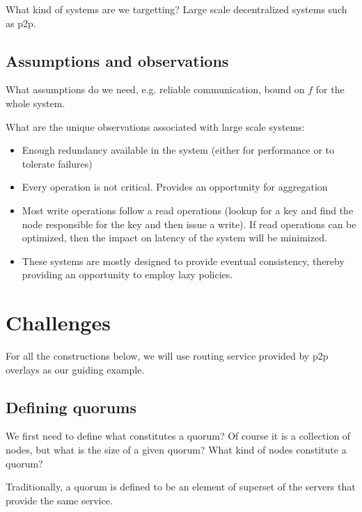 What kind of systems are we targetting? Large scale decentralized systems such as p2p. 
 
\subsection{Assumptions and observations} 
What assumptions do we need, e.g. reliable communication, bound on $f$ for the whole system. 
 
What are the unique observations associated with large scale systems: 
\begin{itemize} 
\item{} Enough redundancy available in the system (either for performance or to tolerate failures) 
\item{} Every operation is not critical. Provides an opportunity for aggregation 
\item{} Most write operations follow a read operations (lookup for a key and find the node responsible for the key and then issue a write). If read operations can be optimized, then the impact on latency of the system will be minimized. 
\item{} These systems are mostly designed to provide eventual consistency, thereby providing an opportunity to employ lazy policies. 
\end{itemize} 
 
\section{Challenges} 
 
For all the constructions below, we will use routing service provided by p2p overlays as our guiding example. 
 
\subsection{Defining quorums} 
We first need to define what constitutes a quorum? Of course it is a collection of nodes, but what is the size of a given quorum? What kind of nodes constitute a quorum?  
 
Traditionally, a quorum is defined to be an element of superset of the servers that provide the same service.  
 
